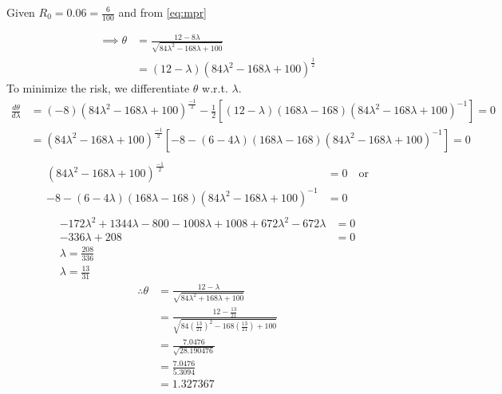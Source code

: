 \documentclass[12pt,a4paper]{article}
\begin{document}
    \begin{spacing}{2.125}
    	Given $R_0  =  0.06  =  \frac{6}{100}$ and from \eqref{eq:mpr}  
  	\end{spacing}
  	\begin{align*}
					\implies  \theta &=  \frac{ 12 -  8\lambda }{  \sqrt{  84 \lambda^2  -  168 \lambda + 100  }  } \\
					      &=  (12  -  \lambda ) ( 84 \lambda^2  -  168 \lambda + 100)^{\frac{1}{2}} 
			\end{align*}
	To minimize the risk, we differentiate $\theta $ w.r.t.  $ \lambda$.
	\begin{align*}
			\frac{d\theta}{ d \lambda }  &=  (-8) ( 84 \lambda^2  -  168 \lambda + 100)^{\frac{-1}{2}}   -  \frac{1}{2} \left[ ( 12 -  \lambda) ( 168\lambda -  168) ( 84 \lambda^2  -  168 \lambda  + 100)^{-1}  \right] = 0\\
			  &=  ( 84 \lambda^2  -  168 \lambda + 100)^{\frac{-1}{2}} \left[    -8  - (6 -  4 \lambda) ( 168 \lambda  -  168)  ( 84 \lambda^2   -  168 \lambda + 100)^{-1}    \right] = 0\\
	\end{align*}
	\begin{align*}
			 ( 84 \lambda^2  -  168 \lambda + 100)^{\frac{-1}{2}}  &=   0 \quad \text{or}\\
			 -8  - (6 -  4 \lambda) ( 168 \lambda  -  168)  ( 84 \lambda^2   -  168 \lambda + 100)^{-1}     &= 0\\
	\end{align*}
	\begin{align*}
			-172 \lambda^2  + 1344 \lambda  -  800  - 1008 \lambda + 1008 + 672 \lambda^2  -  672 \lambda  &= 0\\
			-336  \lambda  + 208  &= 0\\
			\lambda  =  \frac{208}{336}\\
			\lambda  =  \frac{13}{31}
	\end{align*}
	\begin{align*}
			\therefore  \theta  &=  \frac{ 12  -  \lambda }{  \sqrt{  84 \lambda^2   + 168 \lambda  + 100   }}\\
			    &=  \frac{  12   -  \frac{  13}{  21}}{   \sqrt{   84  \left(  \frac{13}{ 21}   \right)^2    -  168 \left(  \frac{13}{ 21}  \right)   + 100   }}\\
			     &=  \frac{    7.0476}{   \sqrt{  28.190476 }}\\
			     &=   \frac{    7.0476}{  5.3094  }\\
			     &=  1.327367
	\end{align*}
\end{document}
